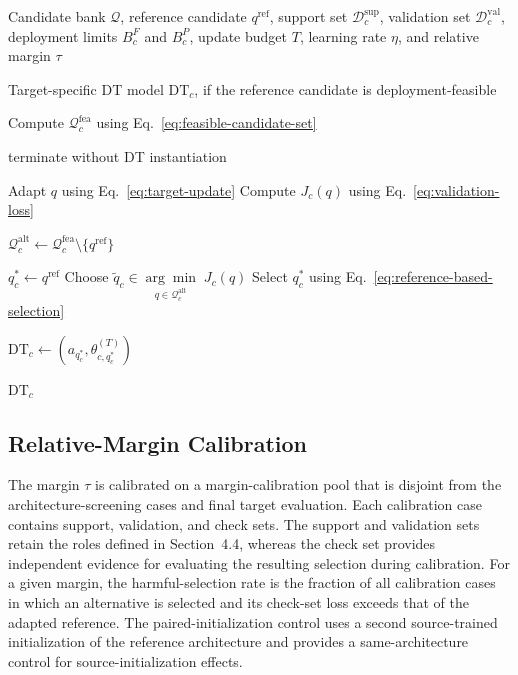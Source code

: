 \documentclass[a4paper,fleqn]{cas-sc}
\begin{document}
\begin{algorithm}[H]
\caption{Target-Side MSA-DTI for One Center}
\label{alg:msa-dti}
\begin{algorithmic}[1]

\Require Candidate bank $\mathcal{Q}$, reference candidate
$q^{\mathrm{ref}}$, support set $\mathcal{D}_{c}^{\mathrm{sup}}$,
validation set $\mathcal{D}_{c}^{\mathrm{val}}$, deployment limits
$B_c^{F}$ and $B_c^{P}$, update budget $T$,
learning rate $\eta$, and relative margin $\tau$

\Ensure Target-specific DT model $\mathrm{DT}_c$, if the reference candidate is deployment-feasible

\State Compute $\mathcal{Q}_{c}^{\mathrm{fea}}$ using
Eq.~\eqref{eq:feasible-candidate-set}

    \State terminate without DT instantiation
\EndIf

    \State Adapt $q$ using Eq.~\eqref{eq:target-update}
    \State Compute $J_c(q)$ using Eq.~\eqref{eq:validation-loss}
\EndFor

\State
$\mathcal{Q}_{c}^{\mathrm{alt}}
\gets
\mathcal{Q}_{c}^{\mathrm{fea}}
\setminus
\{q^{\mathrm{ref}}\}$

    \State $q_c^{*}\gets q^{\mathrm{ref}}$
\Else
    \State Choose
    $\widetilde q_c
    \in
    \underset{q\in\mathcal{Q}_{c}^{\mathrm{alt}}}
    {\arg\min}\;J_c(q)$
    \State Select $q_c^{*}$ using
    Eq.~\eqref{eq:reference-based-selection}
\EndIf

\State
$\mathrm{DT}_{c}
\gets
\left(
a_{q_c^{*}},
\theta_{c,q_c^{*}}^{(T)}
\right)$

\State \Return $\mathrm{DT}_{c}$

\end{algorithmic}
\end{algorithm}

\subsection{Relative-Margin Calibration}

The margin $\tau$ is calibrated on a margin-calibration pool that is disjoint
from the architecture-screening cases and final target evaluation. Each
calibration case contains support, validation, and check sets. The support and
validation sets retain the roles defined in Section~4.4, whereas the check set
provides independent evidence for evaluating the resulting selection during
calibration. For a given margin, the harmful-selection rate is the fraction of
all calibration cases in which an alternative is selected and its check-set
loss exceeds that of the adapted reference. The paired-initialization control
uses a second source-trained initialization of the reference architecture and
provides a same-architecture control for source-initialization effects.
\end{document}

